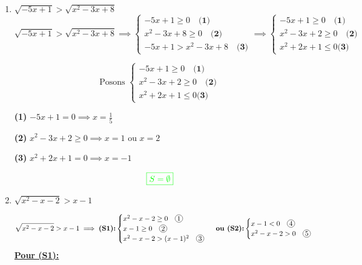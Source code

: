 \documentclass[12pt,a4paper]{article}
\begin{document}
\begin{enumerate}
\begin{enumerate}
\item $\sqrt{-5x+1} > \sqrt{x^2 - 3x + 8}$
\[
\sqrt{-5x+1} > \sqrt{x^2 - 3x + 8} \implies 
\begin{cases}
-5x+1 \geq 0  \quad \textbf{(1)}\\
x^2 - 3x + 8 \geq 0 \quad \textbf{(2)}\\
-5x+1 > x^2 - 3x + 8 \quad \textbf{(3)}
\end{cases}\implies
\begin{cases}
-5x+1 \geq 0  \quad \textbf{(1)}\\
x^2 - 3x + 2 \geq 0 \quad \textbf{(2)}\\
x^2 + 2x + 1 \leq 0 \textbf{(3)}
\end{cases}
\]

\[\text{Posons }
\begin{cases}
-5x+1 \geq 0  \quad \textbf{(1)}\\
x^2 - 3x + 2 \geq 0 \quad \textbf{(2)}\\
x^2 + 2x + 1 \leq 0 \textbf{(3)}
\end{cases}
\]

\textbf{(1)} \( -5x+1 = 0 \implies x = \frac{1}{5} \)

\textbf{(2)} \( x^2 - 3x + 2 \geq 0 \implies x=1 \text{ ou } x=2\)

\textbf{(3)} \( x^2 + 2x + 1 = 0 \implies x=-1\)

\begin{flushleft}
\end{flushleft}

\[
\textcolor{green}{\boxed{S = \emptyset  }} 
\]

\item \( \sqrt{x^{2}-x-2} > x-1 \)

\[
\sqrt{x^2 - x - 2} > x - 1 \implies \textbf{(S1):}
\begin{cases}
x^2 - x - 2 \geq 0 \quad \encercle{1} \\
x - 1 \geq 0 \quad \encercle{2} \\
x^2 - x - 2 > (x-1)^2 \quad \encercle{3}
\end{cases}\textbf{ ou }
\textbf{(S2):}\begin{cases}
x - 1 < 0 \quad \encercle{4} \\
x^2 - x - 2 > 0 \quad \encercle{5}
\end{cases}
\]
\underline{\textbf{Pour (S1):}}


\end{enumerate}
\end{enumerate}
\end{document}
